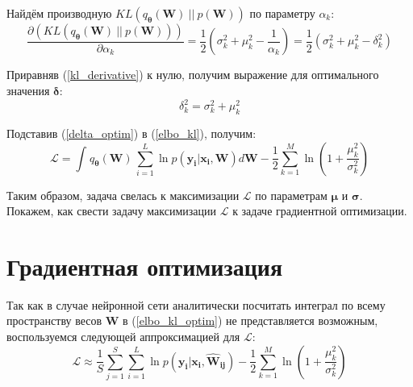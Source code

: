 \documentclass{article}
\numberwithin{equation}{section}
\begin{document}
    Найдём производную $KL(q_{\pmb{\theta}}(\pmb{W})~||~p(\pmb{W}))$ по параметру $\alpha_k$:
    \begin{equation}\label{kl_derivative}
        \frac
            {\partial (KL(q_{\pmb{\theta}}(\pmb{W})~||~p(\pmb{W})))}
            {\partial {\alpha_k}}
        =
            \frac{1}{2} \left(
                \sigma_{k}^2 + \mu_{k}^2 - \dfrac{1}{\alpha_k}
            \right)
        =
            \frac{1}{2} \left(
                \sigma_{k}^2 + \mu_{k}^2 - \delta_{k}^2
            \right)
    \end{equation}

    Приравняв (\ref{kl_derivative}) к нулю, получим выражение для оптимального значения $\pmb{\delta}$:
    \begin{equation}\label{delta_optim}
        \delta_{k}^2 = \sigma_{k}^2 + \mu_{k}^2
    \end{equation}

    Подставив (\ref{delta_optim}) в (\ref{elbo_kl}), получим:
    \begin{equation}\label{elbo_kl_optim}
        \mathcal{L}
        =
            \int_{}{
                q_{\pmb{\theta}}(\pmb{W})
                \,
                \sum_{i=1}^{L}{
                    \ln{
                        p(\pmb{y_{i}} | \pmb{x_{i}}, \pmb{W})
                    }
                }
                d\pmb{W}
            }
        -
            \frac{1}{2} \sum_{k=1}^{M} {
                \ln \left(
                    {1 + \frac{\mu_{k}^2}{\sigma_{k}^2}}
                \right)
            }
    \end{equation}

    Таким образом, задача свелась к максимизации $\mathcal{L}$
    по параметрам $\pmb{\mu}$ и $\pmb{\sigma}$.
    Покажем, как свести задачу максимизации $\mathcal{L}$ к задаче
    градиентной оптимизации.

    \section{Градиентная оптимизация}

    Так как в случае нейронной сети аналитически посчитать интеграл
    по всему пространству весов $\pmb{W}$ в (\ref{elbo_kl_optim}) не представляется возможным,
    воспользуемся следующей аппроксимацией для $\mathcal{L}$:
    \begin{equation}\label{elbo_kl_optim_sum}
        \mathcal{L}
        \approx
            \frac{1}{S} \sum_{j=1}^S \sum_{i=1}^{L} {
                \ln{
                    p(\pmb{y_{i}} | \pmb{x_{i}}, \pmb{\hat{W}_{ij}})
                }
            }
            -
            \frac{1}{2} \sum_{k=1}^{M} {
                \ln \left(
                    {1 + \frac{\mu_{k}^2}{\sigma_{k}^2}}
                \right)
            }
    \end{equation}
\end{document}
